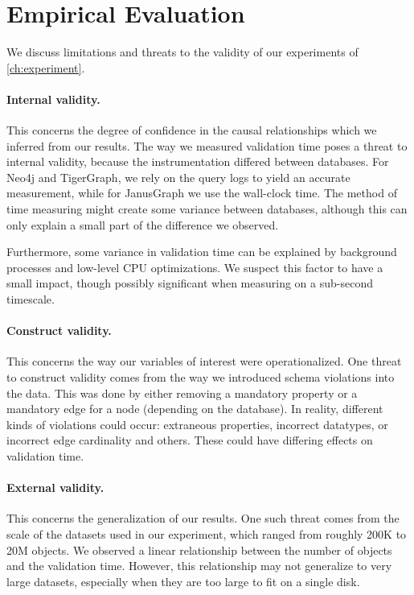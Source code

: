 \documentclass{report}
\theoremstyle{definition}
\begin{document}
\section{Empirical Evaluation}
\label{sec:limitations-experiment}

We discuss limitations and threats to the validity of our experiments of \autoref{ch:experiment}.

\paragraph{Internal validity.} This concerns the degree of confidence in the causal relationships which we inferred from our results. The way we measured validation time poses a threat to internal validity, because the instrumentation differed between databases. For Neo4j and TigerGraph, we rely on the query logs to yield an accurate measurement, while for JanusGraph we use the wall-clock time. The method of time measuring might create some variance between databases, although this can only explain a small part of the difference we observed.

Furthermore, some variance in validation time can be explained by background processes and low-level CPU optimizations. We suspect this factor to have a small impact, though possibly significant when measuring on a sub-second timescale.

\paragraph{Construct validity.} This concerns the way our variables of interest were operationalized. One threat to construct validity comes from the way we introduced schema violations into the data. This was done by either removing a mandatory property or a mandatory edge for a node (depending on the database). In reality, different kinds of violations could occur: extraneous properties, incorrect datatypes, or incorrect edge cardinality and others. These could have differing effects on validation time.

\paragraph{External validity.} This concerns the generalization of our results. One such threat comes from the scale of the datasets used in our experiment, which ranged from roughly 200K to 20M objects. We observed a linear relationship between the number of objects and the validation time. However, this relationship may not generalize to very large datasets, especially when they are too large to fit on a single disk.
\end{document}
